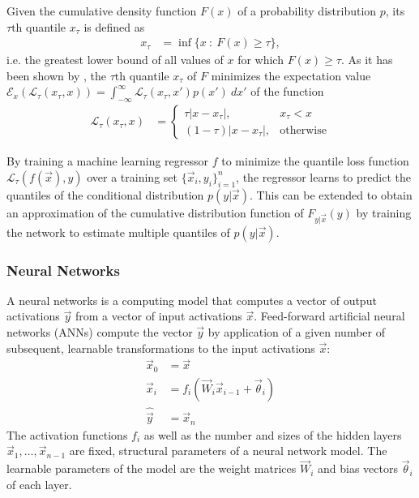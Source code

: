 \documentclass[journal abbreviation, manuscript]{copernicus}
\begin{document}
    Given the cumulative density function $F(x)$ of a probability distribution
    $p$, its $\tau\text{th}$ quantile $x_\tau$ is defined as
    \begin{align}
    x_\tau &= \inf \{x \: : \: F(x) \geq \tau \},
    \end{align}
    i.e. the greatest lower bound of all values of $x$ for which $F(x) \geq \tau$.
    As it has been shown by \citet{koenker}, the $\tau\text{th}$ quantile $x_\tau$ of $F$
    minimizes the expectation value $\mathcal{E}_x\left ( \mathcal{L}_\tau(x_\tau, x) \right) = \int_{-\infty}^\infty \mathcal{L}_\tau(x_\tau, x') p(x') \: dx'$
    of the function
    \begin{align}\label{eq:quantile_loss}
      \mathcal{L}_{\tau}(x_\tau, x) &=
      \begin{cases}
        \tau |x - x_\tau|, & x_\tau < x \\
        (1 - \tau)|x - x_\tau|, &\text{otherwise}
        \end{cases}
    \end{align}

    By training a machine learning regressor $f$ to minimize the quantile loss
    function $\mathcal{L}_\tau(f(\vec{x}), y)$ over a training set $\{\vec{x}_i,
    y_i\}_{i = 1}^n$, the regressor learns to predict the quantiles of the
    conditional distribution $p(y | \vec{x})$. This can be extended to obtain an
    approximation of the cumulative distribution function of $F_{y | \vec{x}}(y)$ by
    training the network to estimate multiple quantiles of $p(y | \vec{x})$.

\subsubsection{Neural Networks}

A neural networks is a computing model that computes a vector of output
activations $\vec{y}$ from a vector of input activations $\vec{x}$. Feed-forward
artificial neural networks (ANNs) compute the
vector $\vec{y}$ by application of a given number of subsequent, learnable
transformations to the input activations $\vec{x}$:
\begin{align*}
    \vec{x}_0 &= \vec{x}\\
    \vec{x}_i &= f_{i}
    \left ( \vec{W}_{i} \vec{x}_{i - 1}+ \vec{\theta}_i \right ) \\
    \hat{\vec{y}} &= \vec{x}_{n}
\end{align*}
The activation functions $f_i$ as well as the number and sizes of the
hidden layers $\vec{x}_1, \ldots, \vec{x}_{n-1}$ are fixed, structural parameters of a neural
network model. The learnable parameters of the model are the weight
matrices $\vec{W}_i$ and bias vectors $\vec{\theta}_i$ of each layer.
\end{document}
